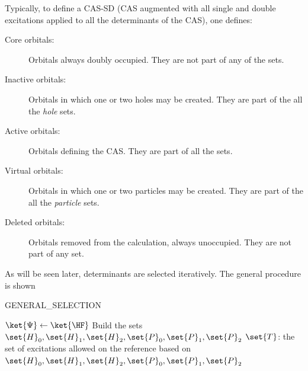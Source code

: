 Typically, to define a CAS-SD (CAS augmented with all single and double excitations applied to all the determinants of the CAS), one defines:
\begin{description}
\item [Core orbitals:]
Orbitals always doubly occupied. They are not part of any of the sets.
\item [Inactive orbitals:]
Orbitals in which one or two holes may be created. They are part of the all the \emph{hole} sets.
\item [Active orbitals:]
Orbitals defining the CAS. They are part of all the sets.
\item [Virtual orbitals:]
Orbitals in which one or two particles may be created. They are part of the all the \emph{particle} sets.
\item [Deleted orbitals:]
Orbitals removed from the calculation, always unoccupied. They are not part of any set.
\end{description}


 As will be seen later, determinants are selected iteratively. The general procedure is shown 



\begin{algorithm}
        \caption{GENERAL\_SELECTION}    
        \label{alg:GENERAL_SELECTION}   
        $\ket{\Psi} \gets \ket{\HF}$\;
        Build the sets $\set{H}_0, \set{H}_1, \set{H}_2, \set{P}_0, \set{P}_1, \set{P}_2$ \;
        $\set{T}$: the set of excitations allowed on the reference based on $\set{H}_0, \set{H}_1, \set{H}_2, \set{P}_0, \set{P}_1, \set{P}_2$ \;
        
\end{algorithm}




